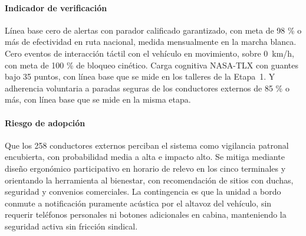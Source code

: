 
\paragraph{Indicador de verificación} Línea base cero de alertas con parador calificado garantizado,
con meta de 98 \% o más de efectividad en ruta nacional, medida mensualmente en la marcha blanca. Cero
eventos de interacción táctil con el vehículo en movimiento, sobre 0~km/h, con meta de 100 \% de
bloqueo cinético.
Carga cognitiva NASA-TLX con guantes bajo 35 puntos, con línea base que se mide en los talleres de la
Etapa~1. Y adherencia voluntaria a paradas seguras de los conductores externos de 85 \% o más, con
línea base que se mide en la misma etapa.

\paragraph{Riesgo de adopción} Que los 258 conductores externos perciban el sistema como vigilancia
patronal encubierta, con probabilidad media a alta e impacto alto. Se mitiga mediante diseño
ergonómico participativo en horario de relevo en los cinco terminales y orientando la herramienta al
bienestar, con recomendación de sitios con duchas, seguridad y convenios comerciales. La contingencia
es que la unidad a bordo conmute a notificación puramente acústica por el altavoz del vehículo, sin
requerir teléfonos personales ni botones adicionales en cabina, manteniendo la seguridad activa sin
fricción sindical.
